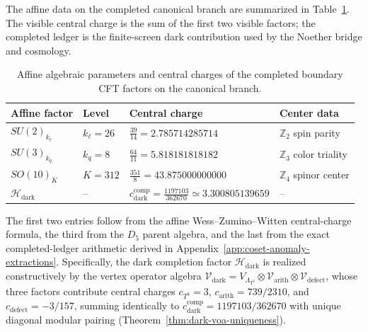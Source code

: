 \documentclass[11pt,letterpaper]{article}
\theoremstyle{plain}
\newcommand{\kell}{k_{\ell}}
\newcommand{\kq}{k_q}
\newcommand{\Kpar}{K}
\newcommand{\cdarkcomp}{c_{\text{dark}}^{\text{comp}}}
\begin{document}
The affine data on the completed canonical branch are summarized in
Table~\ref{tab:section-three-affine-central-charges}.  The visible central
charge is the sum of the first two visible factors; the completed ledger is the
finite-screen dark contribution used by the Noether bridge and cosmology.
\begin{table}[htbp]
\centering
\small
\begin{tabular}{@{}llll@{}}
\toprule
Affine factor & Level & Central charge & Center data \\
\midrule
$SU(2)_{\kell}$ & $\kell=26$ &
$\displaystyle \frac{39}{14}=2.785714285714$ &
$\mathbb Z_2$ spin parity \\
$SU(3)_{\kq}$ & $\kq=8$ &
$\displaystyle \frac{64}{11}=5.818181818182$ &
$\mathbb Z_3$ color triality \\
$SO(10)_{\Kpar}$ & $\Kpar=312$ &
$\displaystyle \frac{351}{8}=43.875000000000$ &
$\mathbb Z_4$ spinor center \\
$\mathcal H_{\text{dark}}$ & $\text{--}$ &
$\displaystyle \cdarkcomp=\frac{1197103}{362670}\simeq3.300805139659$ &
$\text{--}$ \\
\bottomrule
\end{tabular}
\caption{Affine algebraic parameters and central charges of the completed
boundary CFT factors on the canonical branch.}
\label{tab:section-three-affine-central-charges}
\end{table}
The first two entries follow from the affine Wess--Zumino--Witten central-charge
formula, the third from the $D_5$ parent algebra, and the last from the exact
completed-ledger arithmetic derived in
Appendix~\ref{app:coset-anomaly-extractions}. Specifically, the dark completion
factor $\mathcal H_{\text{dark}}$ is realized constructively by the vertex operator algebra
$\mathcal{V}_{\text{dark}} = V_{\Lambda_{T^3}} \otimes \mathcal{V}_{\text{arith}} \otimes \mathcal{V}_{\text{defect}}$,
whose three factors contribute central charges $c_{T^3} = 3$, $c_{\text{arith}} = 739/2310$,
and $c_{\text{defect}} = -3/157$, summing identically to $c_{\text{dark}}^{\text{comp}} = 1197103/362670$
with unique diagonal modular pairing (Theorem~\ref{thm:dark-voa-uniqueness}).
\end{document}
